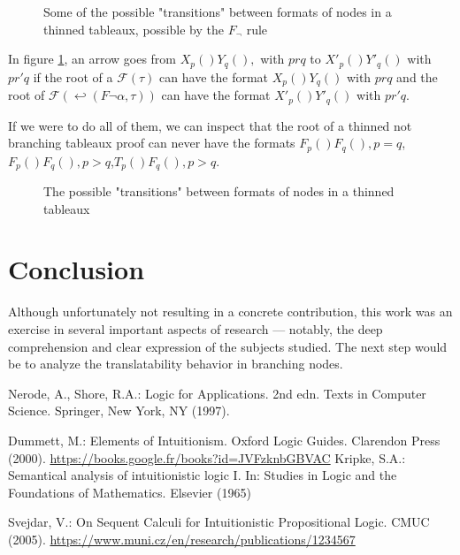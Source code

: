\documentclass[runningheads]{llncs}
\begin{document}
 \begin{figure}
 \nnn
 \caption{Some of the possible "transitions" between formats of nodes in a thinned tableaux, possible by the $F_\neg$ rule}
 \label{figureneg}
 \end{figure}

 In figure \ref{figureneg}, an arrow goes from $X_p () Y_q (), $ with $ p r q $ to $X'_p () Y'_q ()  $ with $ p r' q $ if the root of a $\mathcal{F}(\tau)$ can have the format $X_p () Y_q ()  $ with $ p r q $
  and the root of $\mathcal{F}(\hookleftarrow(F \neg \alpha ,\tau))$
 can have the format $X'_p () Y'_q () $ with $ p r' q $. 



If we were to do all of them, we can inspect that the root  of a thinned not branching tableaux proof can never have 
the formats $F_p () F_q (), p=q$, $F_p () F_q (), p>q$,$T_p () F_q (), p>q$.


\begin{figure}
    \fs
    \caption{The possible "transitions" between formats of nodes in a thinned tableaux }
    \label{figuretotal}
\end{figure}

%
%
%
% 
% 
%
\section{ Conclusion}
    Although unfortunately not resulting in a concrete contribution, this work was an exercise in several important aspects of research — notably,
     the deep comprehension and clear expression of the subjects studied. 
     The next step would be to analyze the translatability behavior in branching nodes.

\begin{thebibliography}{8}

    Nerode, A., Shore, R.A.: Logic for Applications. 2nd edn. Texts in Computer Science. Springer, New York, NY (1997). 
    
    Dummett, M.: Elements of Intuitionism. Oxford Logic Guides. Clarendon Press (2000). \url{https://books.google.fr/books?id=JVFzknbGBVAC}
    Kripke, S.A.: Semantical analysis of intuitionistic logic I. In: Studies in Logic and the Foundations of Mathematics. Elsevier (1965)


    Svejdar, V.: On Sequent Calculi for Intuitionistic Propositional Logic. CMUC (2005). \url{https://www.muni.cz/en/research/publications/1234567}


\end{thebibliography}
\end{document}
